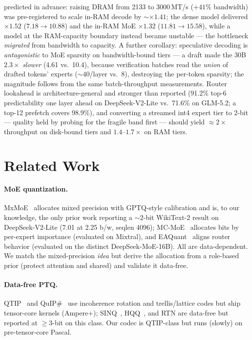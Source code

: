 \documentclass[10pt]{article}
\begin{document}
predicted in advance: raising DRAM from 2133 to 3000\,MT/s ($+41\%$ bandwidth) was pre-registered to
scale in-RAM decode by ${\sim}\times1.41$; the dense model delivered $\mathbf{\times1.52}$
($7.18\to10.88$) and the in-RAM MoE $\times1.32$ ($11.81\to15.58$), while a model at the RAM-capacity
boundary instead became unstable --- the bottleneck \emph{migrated} from bandwidth to capacity. A further
corollary: speculative decoding is \emph{antagonistic} to MoE sparsity on bandwidth-bound tiers --- a
draft made the 30B $2.3\times$ \emph{slower} (4.61 vs.\ 10.4), because verification batches read the
\emph{union} of drafted tokens' experts (${\sim}40$/layer vs.\ 8), destroying the per-token sparsity;
the magnitude follows from the same batch-throughput measurements. Router lookahead is architecture-general and
stronger than reported (91.2\% top-6 predictability one layer ahead on DeepSeek-V2-Lite vs.\ 71.6\% on
GLM-5.2; a top-12 prefetch covers 98.9\%), and converting a streamed int4 expert tier to 2-bit ---
quality held by probing for the fragile band first --- should yield ${\approx}2\times$ throughput on
disk-bound tiers and $1.4$--$1.7\times$ on RAM tiers.

\section{Related Work}\label{sec:related}
\paragraph{MoE quantization.}
MxMoE~\cite{mxmoe} allocates mixed precision with GPTQ-style calibration and is, to our knowledge, the
only prior work reporting a ${\sim}2$-bit WikiText-2 result on DeepSeek-V2-Lite (7.01 at 2.25 b/w, seqlen
4096); MC-MoE~\cite{mcmoe} allocates bits by per-expert importance (evaluated on Mixtral), and
EAQuant~\cite{eaquant} aligns router behavior (evaluated on the distinct DeepSeek-MoE-16B). All are
data-dependent. We match the
mixed-precision \emph{idea} but derive the allocation from a role-based prior (protect attention and shared) and validate it
data-free.

\paragraph{Data-free PTQ.}
QTIP~\cite{qtip} and QuIP\#~\cite{quip} use incoherence rotation and trellis/lattice codes but ship
tensor-core kernels (Ampere$+$); SINQ~\cite{sinq}, HQQ~\cite{hqq}, and RTN are data-free but reported at
$\geq3$-bit on this class. Our codec is QTIP-class but runs (slowly) on pre-tensor-core Pascal.
\end{document}
